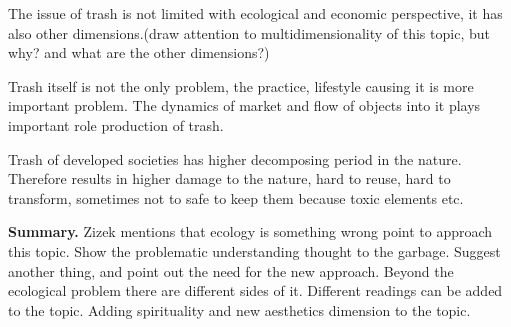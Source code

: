 The issue of trash is not limited with ecological and economic perspective, it has also other dimensions.(draw attention to multidimensionality of this topic, but why? and what are the other dimensions?)

Trash itself is not the only problem, the practice, lifestyle causing it is more important problem. The dynamics of market and flow of objects into it plays important role production of trash.

Trash of developed societies has higher decomposing period in the nature. Therefore results in higher damage to the nature, hard to reuse, hard to transform, sometimes not to safe to keep them because toxic elements etc. 

\textbf{Summary.} Zizek mentions that ecology is something wrong point to approach this topic. Show the problematic understanding thought to the garbage. Suggest another thing, and point out the need for the new approach. Beyond the ecological problem there are different sides of it. Different readings can be added to the topic. Adding spirituality and new aesthetics dimension to the topic. 



